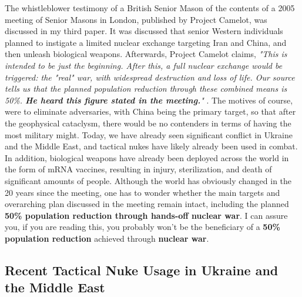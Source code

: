 \documentclass[10pt,twocolumn,letterpaper]{article}
\begin{document}
The whistleblower testimony of a British Senior Mason of the contents of a 2005 meeting of Senior Masons in London, published by Project Camelot, was discussed in my third paper. It was discussed that senior Western individuals planned to instigate a limited nuclear exchange targeting Iran and China, and then unleash biological weapons. Afterwards, Project Camelot claims, \textit{"This is intended to be just the beginning. After this, a full nuclear exchange would be triggered: the "real" war, with widespread destruction and loss of life. Our source tells us that the planned population reduction through these combined means is 50\%. \textbf{He heard this figure stated in the meeting.}"} \cite{23}. The motives of course, were to eliminate adversaries, with China being the primary target, so that after the geophysical cataclysm, there would be no contenders in terms of having the most military might. Today, we have already seen significant conflict in Ukraine and the Middle East, and tactical nukes have likely already been used in combat. In addition, biological weapons have already been deployed across the world in the form of mRNA vaccines, resulting in injury, sterilization, and death of significant amounts of people. Although the world has obviously changed in the 20 years since the meeting, one has to wonder whether the main targets and overarching plan discussed in the meeting remain intact, including the planned \textbf{50\% population reduction through hands-off nuclear war}. I can assure you, if you are reading this, you probably won't be the beneficiary of a \textbf{50\% population reduction} achieved through \textbf{nuclear war}.

\subsection{Recent Tactical Nuke Usage in Ukraine and the Middle East}
\end{document}
